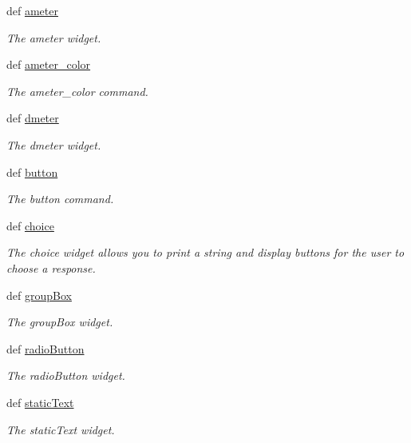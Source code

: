 \begin{DoxyCompactItemize}
def \hyperlink{group___widgets_ga437287c80e84027b6b9bebfe31764202}{ameter}
\begin{DoxyCompactList}\small\item\em The ameter widget. \end{DoxyCompactList}\item 
def \hyperlink{group___widgets_gabe969d0e420d69f79a659f115e810acd}{ameter\-\_\-color}
\begin{DoxyCompactList}\small\item\em The ameter\-\_\-color command. \end{DoxyCompactList}\item 
def \hyperlink{group___widgets_gae047f70bd7485eafe1e352282cf3c999}{dmeter}
\begin{DoxyCompactList}\small\item\em The dmeter widget. \end{DoxyCompactList}\item 
def \hyperlink{group___widgets_ga6ce046794cbbfa9236c745b712fd2d6d}{button}
\begin{DoxyCompactList}\small\item\em The button command. \end{DoxyCompactList}\item 
def \hyperlink{group___widgets_gaae5f45e0ca7c8a0294c75b786d728992}{choice}
\begin{DoxyCompactList}\small\item\em The choice widget allows you to print a string and display buttons for the user to choose a response. \end{DoxyCompactList}\item 
def \hyperlink{group___widgets_ga189db08deeaf2ff69fad7e7e3612fe5b}{group\-Box}
\begin{DoxyCompactList}\small\item\em The group\-Box widget. \end{DoxyCompactList}\item 
def \hyperlink{group___widgets_gaef2c149d7df7f92b718a8660fd0db245}{radio\-Button}
\begin{DoxyCompactList}\small\item\em The radio\-Button widget. \end{DoxyCompactList}\item 
def \hyperlink{group___widgets_gacee37e549f8a877a715b68d39460f7b7}{static\-Text}
\begin{DoxyCompactList}\small\item\em The static\-Text widget. \end{DoxyCompactList}\item 

\end{DoxyCompactItemize}

